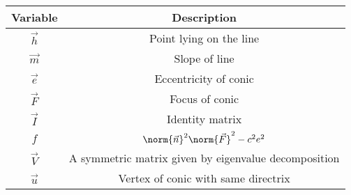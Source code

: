 \begin{tabular}[12pt]{ |c| c|}
    \hline
    \textbf{Variable} & \textbf{Description}\\ 
    \hline
	$\vec{h}$ & Point lying on the line\\
	\hline
	$\vec{m}$ & Slope of line\\
	\hline
	$\vec{e}$ & Eccentricity of conic\\
	\hline
	$\vec{F}$ & Focus of conic\\
	\hline
	$\vec{I}$ & Identity matrix\\
	\hline
	$f$ & $\norm{\vec{n}}^2\norm{\vec{F}}^2-c^2e^2$\\
	\hline
	$\vec{V}$ & A symmetric matrix given by eigenvalue decomposition\\
	\hline
	$\vec{u}$ & Vertex of conic with same directrix\\
	\hline
\end{tabular}
